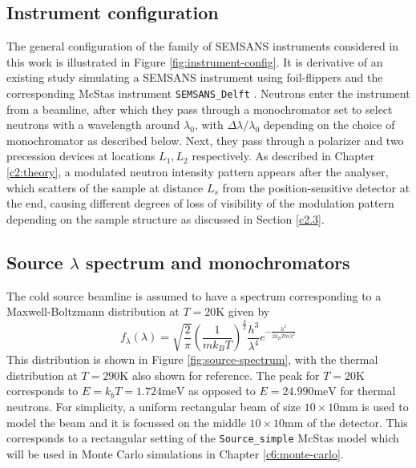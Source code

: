 \documentclass{article}
\begin{document}
\subsection{Instrument configuration}
\label{c3.1}
The general configuration of the family of SEMSANS instruments considered in this work is illustrated in Figure \ref{fig:instrument-config}. It is derivative of an existing study simulating a SEMSANS instrument using foil-flippers and the corresponding McStas instrument \texttt{SEMSANS\_Delft} \cite{bouwman2021b}. Neutrons enter the instrument from a beamline, after which they pass through a monochromator set to select neutrons with a wavelength around $\lambda_0$, with  $\Delta\lambda/\lambda_0$ depending on the choice of monochromator as described below. Next, they pass through a polarizer and two precession devices at locations $L_1, L_2$ respectively. As described in Chapter \ref{c2:theory}, a modulated neutron intensity pattern appears after the analyser, which scatters of the sample at distance $L_s$ from the position-sensitive detector at the end, causing different degrees of loss of visibility of the modulation pattern depending on the sample structure as discussed in Section \ref{c2.3}. 

\subsection{Source $\lambda$ spectrum and monochromators}
\label{c3.2}
The cold source beamline is assumed to have a spectrum corresponding to a Maxwell-Boltzmann distribution at $T = 20 \unit{\kelvin}$ given by 
\begin{equation}
	f_\lambda(\lambda) = \sqrt{\frac{2}{\pi}}\left(\frac{1}{mk_BT}\right)^{\frac{3}{2}}\frac{h^3}{\lambda^4}e^{-\frac{h^2}{2k_BTm\lambda^2}} \label{eq:cold-source-spectrum}
\end{equation}
This distribution is shown in Figure \ref{fig:source-spectrum}, with the thermal distribution at $T=290 \unit{\kelvin}$ also shown for reference. The peak for $T=20 \unit{\kelvin}$ corresponds to $E = k_bT = 1.724 \unit{\milli\electronvolt}$ as opposed to $E = 24.990 \unit{\milli\electronvolt}$ for thermal neutrons. For simplicity, a uniform rectangular beam of size $10\times10\unit{\milli\meter}$ is used to model the beam and it is focussed on the middle $10\times10\unit{\milli\meter}$ of the detector. This corresponds to a rectangular setting of the \texttt{Source\_simple} McStas model which will be used in Monte Carlo simulations in Chapter \ref{c6:monte-carlo}.  
\end{document}
